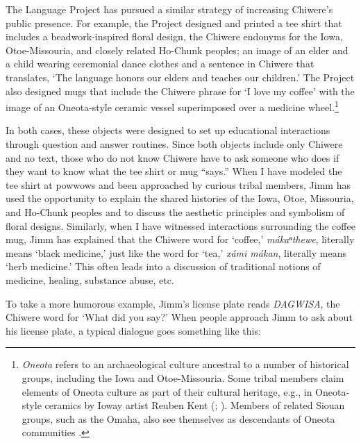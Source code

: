 \documentclass[output=paper]{LSP/langsci}
\begin{document}
The  Language Project has pursued a similar strategy of increasing Chiwere's public presence. For example, the Project designed and printed a tee shirt that includes a beadwork-inspired floral design, the Chiwere endonyms for the Iowa, Otoe-Missouria, and closely related Ho-Chunk peoples; an image of an elder and a child wearing ceremonial dance clothes and a sentence in Chiwere that translates, `The language honors our elders and teaches our children.' The Project also designed mugs that include the Chiwere phrase for `I love my coffee' with the image of an Oneota-style ceramic vessel superimposed over a medicine wheel.\footnote{\emph{Oneota} refers to an archaeological culture ancestral to a number of historical groups, including the Iowa and Otoe-Missouria. Some tribal members claim elements of Oneota culture as part of their cultural heritage, e.g., in Oneota-style ceramics by Ioway artist Reuben Kent (\citeyear{KentND}; \citealt{RundleRundle2007}). Members of related Siouan groups, such as the Omaha, also see themselves as descendants of Oneota communities \citep{Buffalohead2004}.}

In both cases, these objects were designed to set up educational interactions through question and answer routines. Since both objects include only Chiwere and no  text, those who do not know Chiwere have to ask someone who does if they want to know what the tee shirt or mug ``says.'' When I have modeled the tee shirt at powwows and been approached by curious tribal members, Jimm has used the opportunity to explain the shared histories of the Iowa, Otoe, Missouria, and Ho-Chunk peoples and to discuss the aesthetic principles and symbolism of floral designs. Similarly, when I have witnessed interactions surrounding the coffee mug, Jimm has explained that the Chiwere word for `coffee,' \emph{mákaⁿthewe}, literally means `black medicine,' just like the word for `tea,' \emph{xámi mákan}, literally means `herb medicine.' This often leads into a discussion of traditional notions of medicine, healing, substance abuse, etc.

To take a more humorous example, Jimm's license plate reads \emph{DAGWISA}, the Chiwere word for `What did you say?' When people approach Jimm to ask about his license plate, a typical dialogue goes something like this:
\end{document}
